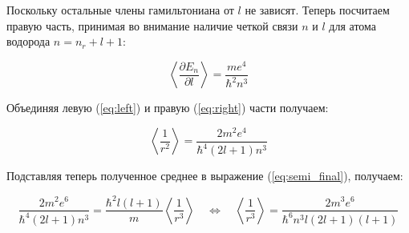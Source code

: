 \documentclass[a4paper, 12pt]{article}
\newcommand{\qlrq}
{\ensuremath{\quad \Leftrightarrow \quad}} %
\begin{document}
Поскольку остальные члены гамильтониана от $l$ не зависят. Теперь посчитаем правую часть, принимая во внимание наличие четкой связи $n$ и $l$ для атома водорода $n = n_r + l + 1$:

\begin{equation}
	\left \langle \frac{\partial E_n}{\partial l} \right \rangle = \frac{m e^4}{\hbar^2 n^3}
	\label{eq:right}
\end{equation}

Объединяя левую (\ref{eq:left}) и правую (\ref{eq:right}) части получаем:

\begin{equation*}
	\left \langle \frac{1}{r^2} \right \rangle = \frac{2 m^2 e^4}{\hbar^4 (2l+1)n^3}
\end{equation*}

Подставляя теперь полученное среднее в выражение (\ref{eq:semi_final}), получаем:

\begin{equation*}
	\frac{2 m^2 e^6}{\hbar^4 (2l+1)n^3} = \frac{\hbar^2 l (l+1)}{m} \left \langle \frac{1}{r^3} \right \rangle \qlrq \boxed{\left \langle \frac{1}{r^3} \right \rangle = \frac{2m^3 e^6}{\hbar^6 n^3 l (2l+1) (l+1)}}
\end{equation*}

	
\end{document}
